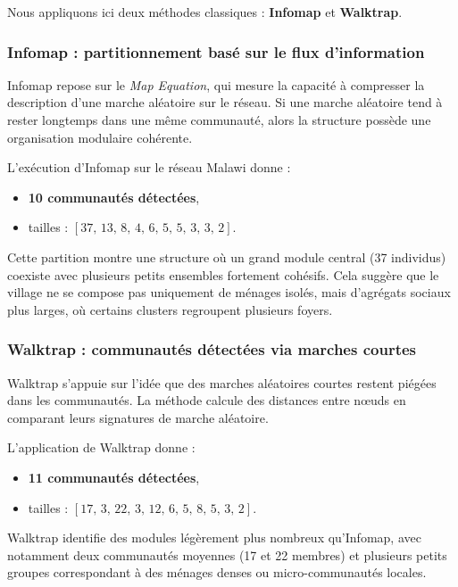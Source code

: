 \documentclass[10pt,twocolumn]{article}
\begin{document}
Nous appliquons ici deux méthodes classiques : \textbf{Infomap} et \textbf{Walktrap}.

\subsubsection*{Infomap : partitionnement basé sur le flux d'information}

Infomap repose sur le \emph{Map Equation}, qui mesure la capacité à compresser
la description d’une marche aléatoire sur le réseau.  
Si une marche aléatoire tend à rester longtemps dans une même communauté,
alors la structure possède une organisation modulaire cohérente.

L’exécution d’Infomap sur le réseau Malawi donne :

\begin{itemize}
    \item \textbf{10 communautés détectées}, 
    \item tailles : $[37,\, 13,\, 8,\, 4,\, 6,\, 5,\, 5,\, 3,\, 3,\, 2]$.
\end{itemize}

Cette partition montre une structure où un grand module central (37 individus)
coexiste avec plusieurs petits ensembles fortement cohésifs.
Cela suggère que le village ne se compose pas uniquement de ménages isolés,
mais d’agrégats sociaux plus larges, où certains clusters regroupent plusieurs foyers.

\subsubsection*{Walktrap : communautés détectées via marches courtes}

Walktrap s’appuie sur l’idée que des marches aléatoires courtes restent
piégées dans les communautés. La méthode calcule des distances entre nœuds
en comparant leurs signatures de marche aléatoire.

L’application de Walktrap donne :

\begin{itemize}
    \item \textbf{11 communautés détectées}, 
    \item tailles : $[17,\, 3,\, 22,\, 3,\, 12,\, 6,\, 5,\, 8,\, 5,\, 3,\, 2]$.
\end{itemize}

Walktrap identifie des modules légèrement plus nombreux qu’Infomap,
avec notamment deux communautés moyennes (17 et 22 membres) et plusieurs
petits groupes correspondant à des ménages denses ou micro-communautés locales.
\end{document}
